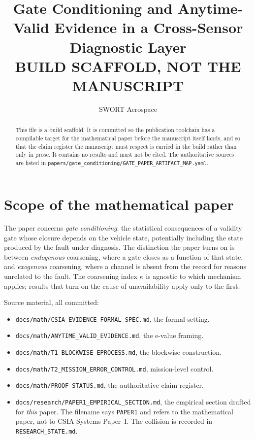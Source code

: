 \documentclass[11pt,a4paper]{article}
\title{Gate Conditioning and Anytime-Valid Evidence in a Cross-Sensor\\
Diagnostic Layer\\[6pt]
\large BUILD SCAFFOLD, NOT THE MANUSCRIPT}
\author{SWORT Aerospace}
\date{}
\newcommand{\code}[1]{\texttt{\small #1}}
\begin{document}
\maketitle

\begin{abstract}
This file is a build scaffold. It is committed so the publication toolchain
has a compilable target for the mathematical paper before the manuscript
itself lands, and so that the claim register the manuscript must respect is
carried in the build rather than only in prose. It contains no results and
must not be cited. The authoritative sources are listed in
\code{papers/gate\_conditioning/GATE\_PAPER\_ARTIFACT\_MAP.yaml}.
\end{abstract}

\section{Scope of the mathematical paper}

The paper concerns \emph{gate conditioning}: the statistical consequences of a
validity gate whose closure depends on the vehicle state, potentially
including the state produced by the fault under diagnosis. The distinction the
paper turns on is between \emph{endogenous} coarsening, where a gate closes as
a function of that state, and \emph{exogenous} coarsening, where a channel is
absent from the record for reasons unrelated to the fault. The coarsening
index $\kappa$ is agnostic to which mechanism applies; results that turn on
the cause of unavailability apply only to the first.

Source material, all committed:
\begin{itemize}
\item \code{docs/math/CSIA\_EVIDENCE\_FORMAL\_SPEC.md}, the formal setting.
\item \code{docs/math/ANYTIME\_VALID\_EVIDENCE.md}, the e-value framing.
\item \code{docs/math/T1\_BLOCKWISE\_EPROCESS.md}, the blockwise construction.
\item \code{docs/math/T2\_MISSION\_ERROR\_CONTROL.md}, mission-level control.
\item \code{docs/math/PROOF\_STATUS.md}, the authoritative claim register.
\item \code{docs/research/PAPER1\_EMPIRICAL\_SECTION.md}, the empirical
      section drafted for \emph{this} paper. The filename says
      \code{PAPER1} and refers to the mathematical paper, not to CSIA Systems
      Paper~I. The collision is recorded in \code{RESEARCH\_STATE.md}.
\end{itemize}
\end{document}
